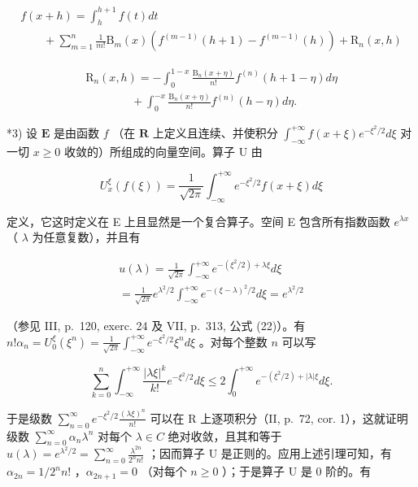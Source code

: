 \[
\begin{array}{l} f (x + h) = \int_ {h} ^ {h + 1} f (t) d t \\ \qquad + \sum_ {m = 1} ^ {n} \frac {1}{m !} \mathrm{B} _ {m} (x) \left(f ^ {(m - 1)} (h + 1) - f ^ {(m - 1)} (h)\right) + \mathrm{R} _ {n} (x, h) \end{array}\tag{35}
\]

\[
\begin{array}{l} \mathrm{R} _ {n} (x, h) = - \int_ {0} ^ {1 - x} \frac {\mathrm{B} _ {n} (x + \eta)}{n !} f ^ {(n)} (h + 1 - \eta) d \eta \\ \qquad \qquad + \int_ {0} ^ {- x} \frac {\mathrm{B} _ {n} (x + \eta)}{n !} f ^ {(n)} (h - \eta) d \eta . \end{array}\tag{36}
\]

*3) 设 \(\mathbf{E}\) 是由函数 \(f\) （在 \(\mathbf{R}\) 上定义且连续、并使积分 \(\int_{-\infty}^{+\infty} f(x + \xi)e^{-\xi^2 / 2}d\xi\) 对一切 \(x \geqslant 0\) 收敛的）所组成的向量空间。算子 \(\mathrm{U}\) 由

\[
U _ {x} ^ {\xi} (f (\xi)) = \frac {1}{\sqrt {2 \pi}} \int_ {- \infty} ^ {+ \infty} e ^ {- \xi^ {2} / 2} f (x + \xi) d \xi
\]

定义，它这时定义在 E 上且显然是一个复合算子。空间 E 包含所有指数函数 \(e^{\lambda x}\) （ \(\lambda\) 为任意复数），并且有

\[
\begin{array}{l} u (\lambda) = \frac {1}{\sqrt {2 \pi}} \int_ {- \infty} ^ {+ \infty} e ^ {- (\xi^ {2} / 2) + \lambda \xi} d \xi \\ = \frac {1}{\sqrt {2 \pi}} e ^ {\lambda^ {2} / 2} \int_ {- \infty} ^ {+ \infty} e ^ {- (\xi - \lambda) ^ {2} / 2} d \xi = e ^ {\lambda^ {2} / 2} \end{array}
\]

（参见 III, p.~120, exerc. 24 及 VII, p.~313, 公式 (22)）。有 \(n! \alpha_n = U_0^\xi (\xi^n) = \frac{1}{\sqrt{2\pi}} \int_{-\infty}^{+\infty} e^{-\xi^2 / 2} \xi^n d\xi\) 。对每个整数 \(n\) 可以写

\[
\sum_ {k = 0} ^ {n} \int_ {- \infty} ^ {+ \infty} \frac {| \lambda \xi | ^ {k}}{k !} e ^ {- \xi^ {2} / 2} d \xi \leqslant 2 \int_ {0} ^ {+ \infty} e ^ {- (\xi^ {2} / 2) + | \lambda | \xi} d \xi .
\]

于是级数 \(\sum_{n=0}^{\infty}e^{-\xi^{2}/2}\frac{(\lambda\xi)^{n}}{n!}\) 可以在 R 上逐项积分（II, p.~72, cor. 1），这就证明级数 \(\sum_{n=0}^{\infty}\alpha_{n}\lambda^{n}\) 对每个 \(\lambda\in C\) 绝对收敛，且其和等于 \(u(\lambda)=e^{\lambda^{2}/2}=\sum_{n=0}^{\infty}\frac{\lambda^{2n}}{2^{n}n!}\) ；因而算子 U 是正则的。应用上述引理可知，有 \(\alpha_{2n}=1/2^{n}n!\) ，\(\alpha_{2n+1}=0\) （对每个 \(n\geqslant0\) ）；于是算子 U 是 0 阶的。有


